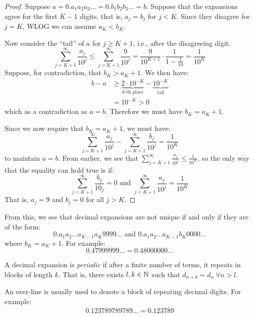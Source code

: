 \documentclass[../main.tex]{subfiles}
\begin{document}
\begin{proof}
  Suppose $a = 0.a_1a_2a_3\ldots = 0.b_1b_2b_3\ldots = b$.
  Suppose that the expansions agree for the first $K - 1$ digits, that is, $a_j = b_j$ for $j < K$.
  Since they disagree for $j = K$, WLOG we can assume $a_K < b_K$.

  Now consider the ``tail'' of $a$ for $j \geq K + 1$, i.e., after the disagreeing digit.
  \[
    \sum_{j = K + 1}^{\infty} \frac{a_j}{10^{j}} \leq \sum_{j = K + 1}^{\infty} \frac{9}{10^{j}} = \frac{9}{10^{K + 1}} \cdot \frac{1}{1-\frac{1}{10}} = \frac{1}{10^{K}}
  \]
  Suppose, for contradiction, that $b_K > a_K + 1$.
  We then have:
  \begin{align*}
    b - a &\geq \underbrace{2 \cdot 10^{-K}}_{\text{$k$-th place}} - \underbrace{10^{-K}}_{\text{tail}} \\
          &= 10^{-K} > 0
  \end{align*}
  which as a contradiction as $a = b$.
  Therefore we must have $b_K = a_K + 1$.

  Since we now require that $b_K = a_K + 1$, we must have:
  \[
    \sum_{j = K + 1}^{\infty} \frac{a_j}{10^{j}} - \sum_{j = K + 1}^{\infty} \frac{b_j}{10^{j}} = \frac{1}{10^{K}}
  \]
  to maintain $a = b$.
  From earlier, we see that $\sum_{j = K +1}^{\infty} \frac{a_j}{10^{j}} \leq \frac{1}{10^{K}}$, so the only way that the equality can hold true is if:
  \[
    \sum_{j = K + 1}^{\infty} \frac{b_j}{10_j} = 0 \text{ and } \sum_{j = K + 1}^{\infty} \frac{a_j}{10^{j}} = \frac{1}{10^{K}}
  \]
  That is, $a_j = 9$ and $b_j = 0$ for all $j > K$.
\end{proof}
\begin{remark}
  From this, we see that decimal expansions are not unique if and only if they are of the form:
  \[
    0.a_1a_2 \ldots a_{K - 1}a_K9999\ldots \text{ and } 0.a_1a_2 \ldots a_{K - 1}b_K0000\ldots
  \]
  where $b_K = a_K + 1$.
  For example:
  \[
    0.47999999\ldots = 0.48000000\ldots
  \]
\end{remark}
\begin{definition}[Periodic]
  A decimal expansion is \textit{periodic} if after a finite number of terms, it repeats in blocks of length $k$.
  That is, there exists $l, k \in \mathbb{N}$ such that $d_{n + k} = d_n\ \forall n > l$.
\end{definition}
\begin{remark}[Notation]
  An over-line is usually used to denote a block of repeating decimal digits.
  For example:
  \[
    0.123789789789\ldots = 0.123\overline{789}
  \]
\end{remark}
\end{document}
